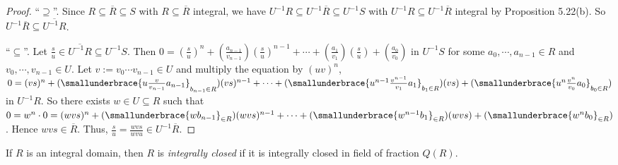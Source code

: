 \begin{proof}
    ``$\supseteq$''. Since $R \subseteq \overbar{R} \subseteq S$ with $R \subseteq \overbar{R}$ integral, we have $U^{-1}R \subseteq U^{-1}\overbar{R} \subseteq U^{-1}S$ with $U^{-1}R \subseteq U^{-1}\overbar{R}$ integral by Proposition 5.22(b). So $U^{-1} \overbar{R} \subseteq \overbar{U^{-1}R}$. \par 
    ``$\subseteq$''. Let $\frac{s}{u} \in \overbar{U^{-1}R} \subseteq U^{-1}S$. Then $0 = (\frac{s}{u})^{n} + (\frac{a_{n-1}}{v_{n-1}})(\frac{s}{u})^{n-1} + \cdots + (\frac{a_1}{v_1})(\frac{s}{u}) + (\frac{a_0}{v_0})$ in $U^{-1}S$ for some $a_0,\cdots,a_{n-1} \in R$ and $v_0,\cdots,v_{n-1} \in U$. Let $v := v_0 \cdots v_{n-1} \in U$ and multiply the equation by $(uv)^{n}$, $0 = (vs)^{n} + (\smallunderbrace{u\frac{v}{v_{n-1}}a_{n-1}}_{b_{n-1} \in R})(vs)^{n-1} + \cdots + (\smallunderbrace{u^{n-1} \frac{v^{n-1}}{v_1}a_1}_{b_1 \in R})(vs) + (\smallunderbrace{u^{n}\frac{v^{n}}{v_0}a_0}_{b_0 \in R})$ in $U^{-1}R$. So there exists $w \in U \subseteq R$ such that $0 = w^n \cdot 0 = (wvs)^{n} + (\smallunderbrace{wb_{n-1}}_{\in R})(wvs)^{n-1} + \cdots + (\smallunderbrace{w^{n-1}b_1}_{\in R})(wvs) + (\smallunderbrace{w^{n}b_0}_{\in R})$. Hence $wvs \in \overbar{R}$. Thus, $\frac{s}{u} = \frac{wvs}{wvu} \in U^{-1}\overbar{R}$.
\end{proof}

\begin{definition}
    If $R$ is an integral domain, then $R$ is \emph{integrally closed} if it is integrally closed in field of fraction $Q(R)$. 
\end{definition}


